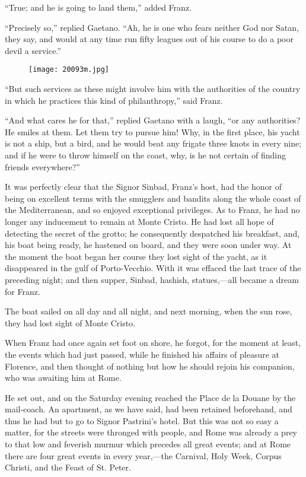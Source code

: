 “True; and he is going to land them,” added Franz.

“Precisely so,” replied Gaetano. “Ah, he is one who fears neither God
nor Satan, they say, and would at any time run fifty leagues out of his
course to do a poor devil a service.”

\begin{figure}[ht]
\texttt{[image: 20093m.jpg]}
\end{figure}

“But such services as these might involve him with the authorities of
the country in which he practices this kind of philanthropy,” said
Franz.

“And what cares he for that,” replied Gaetano with a laugh, “or any
authorities? He smiles at them. Let them try to pursue him! Why, in the
first place, his yacht is not a ship, but a bird, and he would beat any
frigate three knots in every nine; and if he were to throw himself on
the coast, why, is he not certain of finding friends everywhere?”

It was perfectly clear that the Signor Sinbad, Franz’s host, had the
honor of being on excellent terms with the smugglers and bandits along
the whole coast of the Mediterranean, and so enjoyed exceptional
privileges. As to Franz, he had no longer any inducement to remain at
Monte Cristo. He had lost all hope of detecting the secret of the
grotto; he consequently despatched his breakfast, and, his boat being
ready, he hastened on board, and they were soon under way. At the
moment the boat began her course they lost sight of the yacht, as it
disappeared in the gulf of Porto-Vecchio. With it was effaced the last
trace of the preceding night; and then supper, Sinbad, hashish,
statues,—all became a dream for Franz.

The boat sailed on all day and all night, and next morning, when the
sun rose, they had lost sight of Monte Cristo.

When Franz had once again set foot on shore, he forgot, for the moment
at least, the events which had just passed, while he finished his
affairs of pleasure at Florence, and then thought of nothing but how he
should rejoin his companion, who was awaiting him at Rome.

He set out, and on the Saturday evening reached the Place de la Douane
by the mail-coach. An apartment, as we have said, had been retained
beforehand, and thus he had but to go to Signor Pastrini’s hotel. But
this was not so easy a matter, for the streets were thronged with
people, and Rome was already a prey to that low and feverish murmur
which precedes all great events; and at Rome there are four great
events in every year,—the Carnival, Holy Week, Corpus Christi, and the
Feast of St. Peter.

